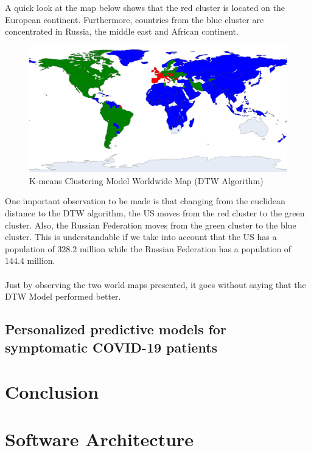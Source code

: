 \documentclass[11pt,a4paper]{article}
\begin{document}
\noindent
A quick look at the map below shows that the red cluster is located on the
European continent. Furthermore, countries from the blue cluster are
concentrated in Russia, the middle east and African continent.
\begin{figure}[H]
    \begin{center}
        \includegraphics[scale=0.9]{img/dtw-clusters-map.png}
    \end{center}
    \vspace{-0.2cm}
    \caption{K-means Clustering Model Worldwide Map (DTW Algorithm)}
\end{figure}
\noindent
One important observation to be made is that changing from the euclidean
distance to the DTW algorithm, the US moves from the {\color{red}red cluster} to
the {\color{ForestGreen}green cluster}. Also, the Russian Federation moves from
the {\color{ForestGreen}green cluster} to the {\color{blue}blue cluster}. This
is understandable if we take into account that the US has a population of
$328.2$ million while the Russian Federation has a population of $144.4$
million.\\
\\
Just by observing the two world maps presented, it goes without saying that the
DTW Model performed better.
\subsection{Personalized predictive models for symptomatic COVID-19 patients}

\newpage
\section{Conclusion}

\newpage
\section{Software Architecture}

\newpage
\printbibliography
\end{document}
